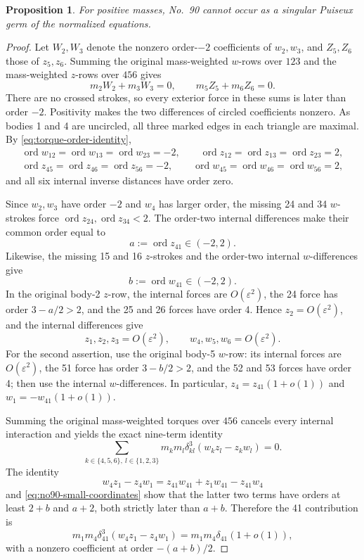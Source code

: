 \documentclass[11pt]{amsart}
\newtheorem{proposition}[theorem]{Proposition}
\theoremstyle{remark}
\newcommand{\ord}{\operatorname{ord}}
\begin{document}
\begin{proposition}\label{prop:no90-excluded}
For positive masses, No.~90 cannot occur as a singular Puiseux germ of the normalized equations.
\end{proposition}
\begin{proof}
Let $W_2,W_3$ denote the nonzero order-$-2$ coefficients of $w_2,w_3$, and $Z_5,Z_6$ those of $z_5,z_6$. Summing the original mass-weighted $w$-rows over $123$ and the mass-weighted $z$-rows over $456$ gives
\[
m_2W_2+m_3W_3=0,\qquad m_5Z_5+m_6Z_6=0.
\]
There are no crossed strokes, so every exterior force in these sums is later than order $-2$. Positivity makes the two differences of circled coefficients nonzero. As bodies 1 and 4 are uncircled, all three marked edges in each triangle are maximal. By \eqref{eq:torque-order-identity},
\begin{equation}\label{eq:no90-inner-orders}
\begin{gathered}
\ord w_{12}=\ord w_{13}=\ord w_{23}=-2,
\qquad \ord z_{12}=\ord z_{13}=\ord z_{23}=2,\\
\ord z_{45}=\ord z_{46}=\ord z_{56}=-2,
\qquad \ord w_{45}=\ord w_{46}=\ord w_{56}=2,
\end{gathered}
\end{equation}
and all six internal inverse distances have order zero.

Since $w_2,w_3$ have order $-2$ and $w_4$ has larger order, the missing 24 and 34 $w$-strokes force $\ord z_{24},\ord z_{34}<2$. The order-two internal differences make their common order equal to
\[
a:=\ord z_{41}\in(-2,2).
\]
Likewise, the missing 15 and 16 $z$-strokes and the order-two internal $w$-differences give
\[
b:=\ord w_{41}\in(-2,2).
\]
In the original body-2 $z$-row, the internal forces are $O(\varepsilon^2)$, the 24 force has order $3-a/2>2$, and the 25 and 26 forces have order 4. Hence $z_2=O(\varepsilon^2)$, and the internal differences give
\begin{equation}\label{eq:no90-small-coordinates}
z_1,z_2,z_3=O(\varepsilon^2),\qquad
w_4,w_5,w_6=O(\varepsilon^2).
\end{equation}
For the second assertion, use the original body-5 $w$-row: its internal forces are $O(\varepsilon^2)$, the 51 force has order $3-b/2>2$, and the 52 and 53 forces have order 4; then use the internal $w$-differences. In particular, $z_4=z_{41}(1+o(1))$ and $w_1=-w_{41}(1+o(1))$.

Summing the original mass-weighted torques over $456$ cancels every internal interaction and yields the exact nine-term identity
\begin{equation}\label{eq:no90-complete-torque}
\sum_{k\in\{4,5,6\},\ l\in\{1,2,3\}}
m_km_l\delta_{kl}^3(w_kz_l-z_kw_l)=0.
\end{equation}
The identity
\[
w_4z_1-z_4w_1
=z_{41}w_{41}+z_1w_{41}-z_{41}w_4
\]
and \eqref{eq:no90-small-coordinates} show that the latter two terms have orders at least $2+b$ and $a+2$, both strictly later than $a+b$. Therefore the 41 contribution is
\begin{equation}\label{eq:no90-leading-torque}
m_1m_4\delta_{41}^3(w_4z_1-z_4w_1)
=m_1m_4\delta_{41}(1+o(1)),
\end{equation}
with a nonzero coefficient at order $-(a+b)/2$.


\end{proof}
\end{document}
